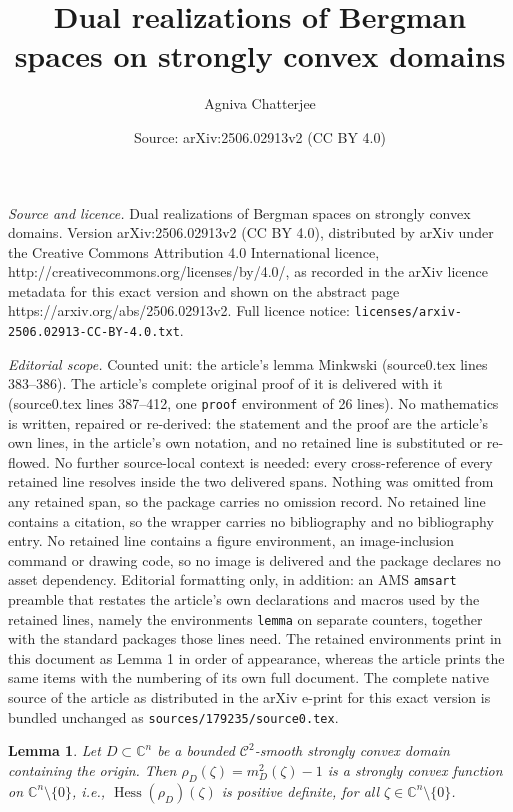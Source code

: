 \documentclass[10pt,a4paper]{amsart}
\title{Dual realizations of Bergman spaces on strongly convex domains}
\author{Agniva Chatterjee}
\date{Source: arXiv:2506.02913v2 (CC BY 4.0)}
\newtheorem{lemma}{Lemma}
\newcommand{\C}{\mathbb C}
\newcommand{\cont}{\mathcal C}
\begin{document}
\maketitle

\noindent\emph{Source and licence.} Dual realizations of Bergman spaces on strongly convex domains. Version arXiv:2506.02913v2 (CC BY 4.0), distributed by arXiv under the Creative Commons Attribution 4.0 International licence, http://creativecommons.org/licenses/by/4.0/, as recorded in the arXiv licence metadata for this exact version and shown on the abstract page https://arxiv.org/abs/2506.02913v2. Full licence notice: \texttt{licenses/arxiv-2506.02913-CC-BY-4.0.txt}.\par\smallskip

\noindent\textit{Editorial scope.} Counted unit: the article's lemma Minkwski (source0.tex lines 383--386). The article's complete original proof of it is delivered with it (source0.tex lines 387--412, one \texttt{proof} environment of 26 lines). No mathematics is written, repaired or re-derived: the statement and the proof are the article's own lines, in the article's own notation, and no retained line is substituted or re-flowed.  No further source-local context is needed: every cross-reference of every retained line resolves inside the two delivered spans.  Nothing was omitted from any retained span, so the package carries no omission record.  No retained line contains a citation, so the wrapper carries no bibliography and no bibliography entry.  No retained line contains a figure environment, an image-inclusion command or drawing code, so no image is delivered and the package declares no asset dependency.  Editorial formatting only, in addition: an AMS \texttt{amsart} preamble that restates the article's own declarations and macros used by the retained lines, namely the environments \texttt{lemma} on separate counters, together with the standard packages those lines need.  The retained environments print in this document as Lemma 1 in order of appearance, whereas the article prints the same items with the numbering of its own full document.  The complete native source of the article as distributed in the arXiv e-print for this exact version is bundled unchanged as \texttt{sources/179235/source0.tex}.
\begin{lemma}\label{le:str cvx of Minkwski}
Let $D\subset\C^n$ be a bounded $\cont^2$-smooth strongly convex domain containing the origin. Then $\rho_D(\zeta)=m_D^2(\zeta)-1$ is a strongly convex function on $\C^n\setminus\{0\}$, i.e.,
$\operatorname{Hess}(\rho_D)(\zeta)$ is positive definite, for all $\zeta\in\C^n\setminus\{0\}$.
\end{lemma}
\end{document}

